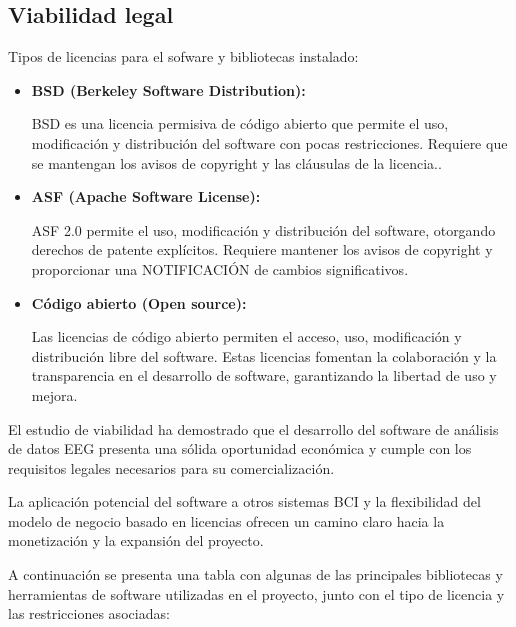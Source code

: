 \subsection{Viabilidad legal}


Tipos de licencias para el sofware y bibliotecas instalado:

\begin{itemize}

  \item
   \textbf{BSD (Berkeley Software Distribution):} 
    
    BSD es una licencia permisiva de código abierto que permite el uso, modificación y distribución del software con pocas restricciones. Requiere que se mantengan los avisos de copyright y las cláusulas de la licencia..
    
  \item
   \textbf{ASF (Apache Software License):}
    
    ASF 2.0 permite el uso, modificación y distribución del software, otorgando derechos de patente explícitos. Requiere mantener los avisos de copyright y proporcionar una NOTIFICACIÓN de cambios significativos.
    
  \item
   \textbf{Código abierto (Open source):}
    
    Las licencias de código abierto permiten el acceso, uso, modificación y distribución libre del software. Estas licencias fomentan la colaboración y la transparencia en el desarrollo de software, garantizando la libertad de uso y mejora.
\end{itemize}


El estudio de viabilidad ha demostrado que el desarrollo del software de análisis de datos EEG presenta una sólida oportunidad económica y cumple con los requisitos legales necesarios para su comercialización.

La aplicación potencial del software a otros sistemas BCI y la flexibilidad del modelo de negocio basado en licencias ofrecen un camino claro hacia la monetización y la expansión del proyecto.

  A continuación se presenta una tabla con algunas de las principales bibliotecas y herramientas de software utilizadas en el proyecto, junto con el tipo de licencia y las restricciones asociadas:


